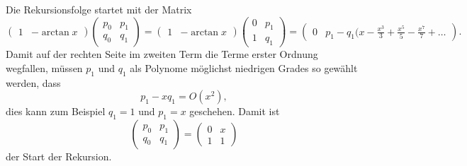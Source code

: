 \begin{refsection}
Die Rekursionsfolge startet mit der Matrix
\[
\begin{pmatrix}
1&-\arctan x
\end{pmatrix}
\begin{pmatrix}
p_0&p_1\\
q_0&q_1
\end{pmatrix}
=
\begin{pmatrix}
1&-\arctan x
\end{pmatrix}
\begin{pmatrix}
0&p_1\\
1&q_1
\end{pmatrix}
=
\begin{pmatrix}
0
&
p_1 - q_1\biggl(x-\frac{x^3}{3}+\frac{x^5}{5}-\frac{x^7}{7}+\dots
\end{pmatrix}.
\]
Damit auf der rechten Seite im zweiten Term die Terme erster Ordnung
wegfallen, müssen $p_1$ und $q_1$ als Polynome möglichst niedrigen Grades
so gewählt werden, dass
\[
p_1-xq_1 = O(x^2),
\]
dies kann zum Beispiel $q_1=1$ und $p_1=x$ geschehen.
Damit ist
\[
\begin{pmatrix}
p_0&p_1\\
q_0&q_1
\end{pmatrix}
=
\begin{pmatrix}
0&x\\
1&1
\end{pmatrix}
\]
der Start der Rekursion.


\end{refsection}
